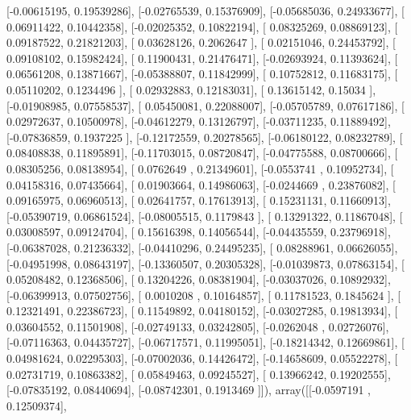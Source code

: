 \documentclass{article}
\begin{document}
       [-0.00615195,  0.19539286],
       [-0.02765539,  0.15376909],
       [-0.05685036,  0.24933677],
       [ 0.06911422,  0.10442358],
       [-0.02025352,  0.10822194],
       [ 0.08325269,  0.08869123],
       [ 0.09187522,  0.21821203],
       [ 0.03628126,  0.2062647 ],
       [ 0.02151046,  0.24453792],
       [ 0.09108102,  0.15982424],
       [ 0.11900431,  0.21476471],
       [-0.02693924,  0.11393624],
       [ 0.06561208,  0.13871667],
       [-0.05388807,  0.11842999],
       [ 0.10752812,  0.11683175],
       [ 0.05110202,  0.1234496 ],
       [ 0.02932883,  0.12183031],
       [ 0.13615142,  0.15034   ],
       [-0.01908985,  0.07558537],
       [ 0.05450081,  0.22088007],
       [-0.05705789,  0.07617186],
       [ 0.02972637,  0.10500978],
       [-0.04612279,  0.13126797],
       [-0.03711235,  0.11889492],
       [-0.07836859,  0.1937225 ],
       [-0.12172559,  0.20278565],
       [-0.06180122,  0.08232789],
       [ 0.08408838,  0.11895891],
       [-0.11703015,  0.08720847],
       [-0.04775588,  0.08700666],
       [ 0.08305256,  0.08138954],
       [ 0.0762649 ,  0.21349601],
       [-0.0553741 ,  0.10952734],
       [ 0.04158316,  0.07435664],
       [ 0.01903664,  0.14986063],
       [-0.0244669 ,  0.23876082],
       [ 0.09165975,  0.06960513],
       [ 0.02641757,  0.17613913],
       [ 0.15231131,  0.11660913],
       [-0.05390719,  0.06861524],
       [-0.08005515,  0.1179843 ],
       [ 0.13291322,  0.11867048],
       [ 0.03008597,  0.09124704],
       [ 0.15616398,  0.14056544],
       [-0.04435559,  0.23796918],
       [-0.06387028,  0.21236332],
       [-0.04410296,  0.24495235],
       [ 0.08288961,  0.06626055],
       [-0.04951998,  0.08643197],
       [-0.13360507,  0.20305328],
       [-0.01039873,  0.07863154],
       [ 0.05208482,  0.12368506],
       [ 0.13204226,  0.08381904],
       [-0.03037026,  0.10892932],
       [-0.06399913,  0.07502756],
       [ 0.0010208 ,  0.10164857],
       [ 0.11781523,  0.1845624 ],
       [ 0.12321491,  0.22386723],
       [ 0.11549892,  0.04180152],
       [-0.03027285,  0.19813934],
       [ 0.03604552,  0.11501908],
       [-0.02749133,  0.03242805],
       [-0.0262048 ,  0.02726076],
       [-0.07116363,  0.04435727],
       [-0.06717571,  0.11995051],
       [-0.18214342,  0.12669861],
       [ 0.04981624,  0.02295303],
       [-0.07002036,  0.14426472],
       [-0.14658609,  0.05522278],
       [ 0.02731719,  0.10863382],
       [ 0.05849463,  0.09245527],
       [ 0.13966242,  0.19202555],
       [-0.07835192,  0.08440694],
       [-0.08742301,  0.1913469 ]]), array([[-0.0597191 ,  0.12509374],
\end{document}
